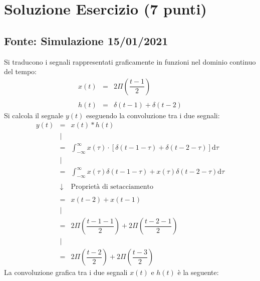 \documentclass[a4paper]{article}
\begin{document}
	\section{Soluzione Esercizio (7 punti)}
	\subsection*{Fonte: Simulazione 15/01/2021}
	
	Si traducono i segnali rappresentati graficamente in funzioni nel dominio continuo del tempo:
	\begin{equation*}
		\begin{array}{lll}
			x\left(t\right) & = & 2 \Pi \left(\dfrac{t-1}{2}\right) \\
			&& \\
			h\left(t\right) & = & \delta\left(t-1\right) + \delta\left(t-2\right)
		\end{array}
	\end{equation*}
	Si calcola il segnale $y\left(t\right)$ eseguendo la convoluzione tra i due segnali:
	\begin{equation*}
		\begin{array}{lcl}
			y\left(t\right)	& = & x\left(t\right) * h\left(t\right) \\
							& | & \\
							& = & \displaystyle\int_{-\infty}^{\infty} x\left(\tau\right) \cdot \left[\delta\left(t - 1 - \tau\right) + \delta\left(t - 2 - \tau\right)\right] \mathrm{d}\tau \\
							& | & \\
							& = & \displaystyle\int_{-\infty}^{\infty} x\left(\tau\right) \delta\left(t - 1 - \tau\right) + x\left(\tau\right)\delta\left(t - 2 - \tau\right) \mathrm{d}\tau \\
							&  & \\
							& \downarrow & \text{Proprietà di setacciamento} \\
							&  & \\
							& = & x\left(t-2\right) + x\left(t-1\right) \\
							& | & \\
							& = & 2\Pi\left(\dfrac{t - 1 -1}{2}\right) + 2\Pi\left(\dfrac{t - 2 - 1}{2}\right) \\
							& | & \\
							& = & 2\Pi\left(\dfrac{t-2}{2}\right) + 2\Pi\left(\dfrac{t-3}{2}\right)
		\end{array}
	\end{equation*}\newpage
	La convoluzione grafica tra i due segnali $x\left(t\right)$ e $h\left(t\right)$ è la seguente:
\end{document}
